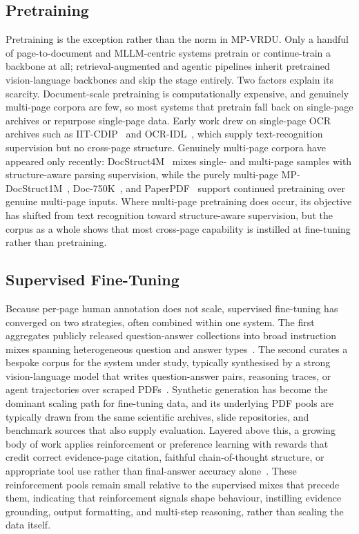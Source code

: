 \subsection{Pretraining}
\label{sec:dataset-pt}
Pretraining is the exception rather than the norm in MP-VRDU. Only a handful of page-to-document and MLLM-centric systems pretrain or continue-train a backbone at all; retrieval-augmented and agentic pipelines inherit pretrained vision-language backbones and skip the stage entirely. Two factors explain its scarcity. Document-scale pretraining is computationally expensive, and genuinely multi-page corpora are few, so most systems that pretrain fall back on single-page archives or repurpose single-page data. Early work drew on single-page OCR archives such as IIT-CDIP~\citep{lewis2006building} and OCR-IDL~\citep{biten2022ocr}, which supply text-recognition supervision but no cross-page structure. Genuinely multi-page corpora have appeared only recently: DocStruct4M~\citep{hu2024mplug} mixes single- and multi-page samples with structure-aware parsing supervision, while the purely multi-page MP-DocStruct1M~\citep{hu2025mplug}, Doc-750K~\citep{duan2025docopilot}, and PaperPDF~\citep{xie2026pdf} support continued pretraining over genuine multi-page inputs. Where multi-page pretraining does occur, its objective has shifted from text recognition toward structure-aware supervision, but the corpus as a whole shows that most cross-page capability is instilled at fine-tuning rather than pretraining.

\subsection{Supervised Fine-Tuning}
\label{sec:dataset-sft}
Because per-page human annotation does not scale, supervised fine-tuning has converged on two strategies, often combined within one system. The first aggregates publicly released question-answer collections into broad instruction mixes spanning heterogeneous question and answer types~\citep{tanaka2024instructdoc, jia2025leopard, hu2025mplug, duan2025docopilot}. The second curates a bespoke corpus for the system under study, typically synthesised by a strong vision-language model that writes question-answer pairs, reasoning traces, or agent trajectories over scraped PDFs~\citep{xie2026pdf, tanaka2025vdocrag, wu2025molorag, zhang2026docdancer, guo2026end}. Synthetic generation has become the dominant scaling path for fine-tuning data, and its underlying PDF pools are typically drawn from the same scientific archives, slide repositories, and benchmark sources that also supply evaluation. Layered above this, a growing body of work applies reinforcement or preference learning with rewards that credit correct evidence-page citation, faithful chain-of-thought structure, or appropriate tool use rather than final-answer accuracy alone~\citep{xiong2026docr1, guo2026end, yan2026docseeker}. These reinforcement pools remain small relative to the supervised mixes that precede them, indicating that reinforcement signals shape behaviour, instilling evidence grounding, output formatting, and multi-step reasoning, rather than scaling the data itself.

